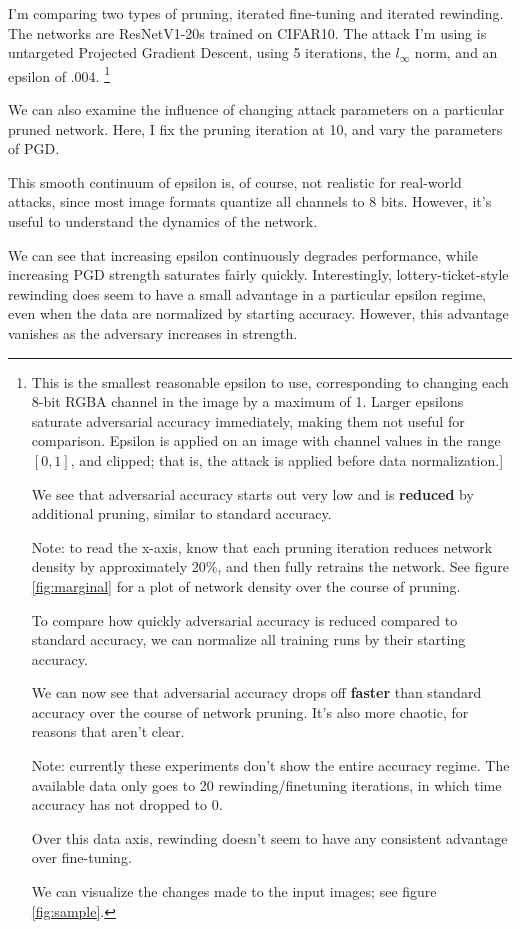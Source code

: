 \documentclass[11pt]{article}
\begin{document}
I'm comparing two types of pruning, iterated fine-tuning and iterated rewinding. The networks are ResNetV1-20s trained on CIFAR10. The attack I'm using is
untargeted Projected Gradient Descent, using 5 iterations, the \(l_\infty\) norm, and an epsilon of .004. \footnote{This is the smallest reasonable epsilon to use, corresponding to changing each 8-bit RGBA channel in the image by a maximum of 1. Larger epsilons saturate adversarial accuracy immediately, making them not useful for comparison. Epsilon is applied on an image with channel values in the range \([0,1]\), and clipped; that is, the attack is applied before data normalization.]

We see that adversarial accuracy starts out very low and is \textbf{reduced} by additional pruning, similar to standard accuracy.

Note: to read the x-axis, know that each pruning iteration reduces network density by approximately 20\%, and then fully retrains the network.
See figure \ref{fig:marginal} for a plot of network density over the course of pruning.

\newpage

To compare how quickly adversarial accuracy is reduced compared to standard accuracy, we can normalize all training runs by their starting
accuracy.

We can now see that adversarial accuracy drops off \textbf{faster} than standard accuracy over the course of network pruning. It's also more chaotic,
for reasons that aren't clear.

Note: currently these experiments don't show the entire accuracy regime. The available data only goes to 20 rewinding/finetuning iterations,
in which time accuracy has not dropped to 0.

Over this data axis, rewinding doesn't seem to have any consistent advantage over fine-tuning.

We can visualize the changes made to the input images; see figure \ref{fig:sample}.}

We can also examine the influence of changing attack parameters on a particular pruned network.
Here, I fix the pruning iteration at 10, and vary the parameters of PGD.

This smooth continuum of epsilon is, of course, not realistic for real-world attacks, since most image formats quantize
all channels to 8 bits. However, it's useful to understand the dynamics of the network.

We can see that increasing epsilon continuously degrades performance, while increasing PGD strength saturates fairly quickly. Interestingly,
lottery-ticket-style rewinding does seem to have a small advantage in a particular epsilon regime, even when the data are normalized by starting accuracy.
However, this advantage vanishes as the adversary increases in strength.
\end{document}
